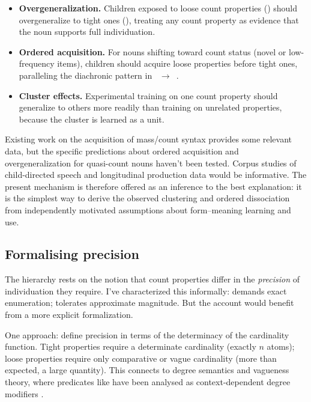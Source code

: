 \documentclass[12pt,a4paper]{article}
\begin{document}
\begin{itemize}
\item \textbf{Overgeneralization.} Children exposed to loose count properties () should overgeneralize to tight ones (), treating any count property as evidence that the noun supports full individuation.
\item \textbf{Ordered acquisition.} For nouns shifting toward count status (novel or low-frequency items), children should acquire loose properties before tight ones, paralleling the diachronic pattern in ~$\to$~.
\item \textbf{Cluster effects.} Experimental training on one count property should generalize to others more readily than training on unrelated properties, because the cluster is learned as a unit.
\end{itemize}

Existing work on the acquisition of mass/count syntax \citep{barner2005} provides some relevant data, but the specific predictions about ordered acquisition and overgeneralization for quasi-count nouns haven't been tested. Corpus studies of child-directed speech and longitudinal production data would be informative. The present mechanism is therefore offered as an inference to the best explanation: it is the simplest way to derive the observed clustering and ordered dissociation from independently motivated assumptions about form--meaning learning and use.

\subsection{Formalising precision}

The hierarchy rests on the notion that count properties differ in the \textit{precision} of individuation they require. I've characterized this informally:  demands exact enumeration;  tolerates approximate magnitude. But the account would benefit from a more explicit formalization.

One approach: define precision in terms of the determinacy of the cardinality function. Tight properties require a determinate cardinality (exactly $n$ atoms); loose properties require only comparative or vague cardinality (more than expected, a large quantity). This connects to degree semantics and vagueness theory, where predicates like  have been analysed as context-dependent degree modifiers \citep{hackl2000}.
\end{document}
